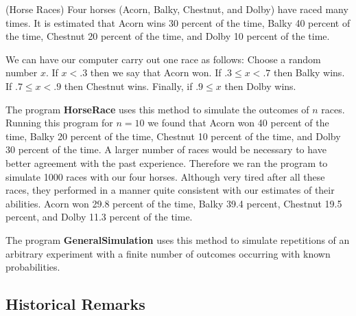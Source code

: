 \begin{example}(Horse Races)\label{exam 1.4}
Four horses (Acorn, Balky, Chestnut, and Dolby) have raced many
times.  It is estimated that Acorn wins 30 percent of the time, Balky 40
percent of the time, Chestnut 20 percent of the time, and Dolby 10 percent of
the time. 
\par
We can have our computer carry out one race as follows:  
Choose a random number $x$.  If $x < .3$ then we say that Acorn won.  If $.3 \le x < .7$
then Balky wins.  If $.7 \le x < .9$ then Chestnut wins.  Finally, if $.9 \le x$ then
Dolby wins. 
\par
The program {\bf HorseRace} uses this method to simulate the outcomes of
$n$ races.   Running this program for $n = 10$ we found that  Acorn won 40 percent of the time,
Balky 20 percent of the time, Chestnut 10 percent of the time, and Dolby 30 percent of the time.  
A larger number of races would be necessary to have better agreement with the past experience.
Therefore we ran the program to simulate 1000 races with our four horses. 
Although very tired after all these races, they performed in a manner quite consistent
with our estimates of their abilities. Acorn won 29.8 percent of the time,
Balky 39.4 percent, Chestnut 19.5 percent, and Dolby 11.3 percent of the time. 
\par
The program {\bf GeneralSimulation} uses this method to simulate
repetitions of an arbitrary experiment with a finite number of outcomes occurring with known
probabilities.
\end{example}

\subsection*{Historical Remarks}

